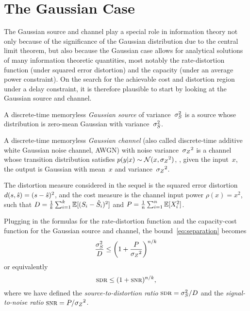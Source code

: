 \section{The Gaussian Case}\label{sec:gaussian}

The Gaussian source and channel play a special role in information theory not
only because of the significance of the Gaussian distribution due to the central
limit theorem, but also because the Gaussian case allows for analytical
solutions of many information theoretic quantities, most notably the
rate-distortion function (under squared error distortion) and the capacity
(under an average power constraint). On the search for the achievable cost and
distortion region under a delay constraint, it is therefore plausible to start
by looking at the Gaussian source and channel. 

\begin{definition}
  \label{def:gaussiansc}
  A discrete-time memoryless \emph{Gaussian source} of variance~${\sigma_S^2}$ is a
  source whose distribution is zero-mean Gaussian with variance~${\sigma_S^2}$.

  A discrete-time memoryless \emph{Gaussian channel} (also called discrete-time
  additive white Gaussian noise channel, AWGN) with noise variance~${{\sigma_Z}^2}$ is a
  channel whose transition distribution satisfies $p(y|x) \sim \mathcal{N}(x, {{\sigma_Z}^2})$,
  \ie, given the input~$x$, the output is Gaussian with mean~$x$ and
  variance~${{\sigma_Z}^2}$.
\end{definition}

The distortion measure considered in the sequel is the squared error distortion
$d(s,{\hat{s}}) = (s - {\hat{s}})^2$, and the cost measure is the channel input power
$\rho(x) = x^2$, such that $D = \frac1k \sum_{i=1}^k \mathbb{E}[(S_i - {\hat{S}}_i)^2]$ and $P
= \frac1n \sum_{i=1}^n \mathbb{E}[X_i^2]$.

Plugging in the formulas for the rate-distortion function and the capacity-cost
function for the Gaussian source and channel, the bound~\eqref{eq:separation}
becomes
\begin{equation}
  \label{eq:gausssep}
  \frac{{\sigma_S^2}}{D} \le \left( 1 + \frac{P}{{{\sigma_Z}^2}} \right)^{n/k}
\end{equation}
or equivalently
\begin{equation}
  \label{eq:gausssepsdr}
  \sdr \le (1 + \snr)^{n/k},
\end{equation}
where we have defined the \emph{source-to-distortion ratio} $\sdr = \ssq/D$ and
the \emph{signal-to-noise ratio} $\snr = P/\szq$. 


